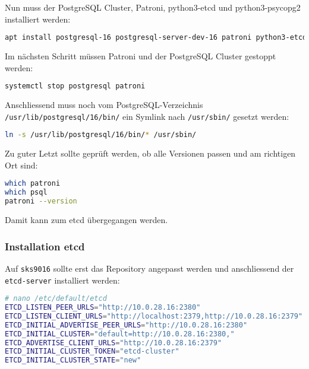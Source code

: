 Nun muss der \Gls{PostgreSQL Cluster}, Patroni, python3-etcd und python3-psycopg2 installiert werden:
\lstset{style=gra_codestyle}
\begin{lstlisting}[language=bash, caption=Patroni - Prerequisites installieren,captionpos=b,label={lst:patroni-prerequisites-install},breaklines=true]
apt install postgresql-16 postgresql-server-dev-16 patroni python3-etcd python3-psycopg2
\end{lstlisting}

Im nächsten Schritt müssen Patroni und der \Gls{PostgreSQL Cluster} gestoppt werden:
\lstset{style=gra_codestyle}
\begin{lstlisting}[language=bash, caption=Patroni - Stop Patroni und PostgreSQL,captionpos=b,label={lst:patroni-stop-postgresql-patroni},breaklines=true]
systemctl stop postgresql patroni
\end{lstlisting}

Anschliessend muss noch vom PostgreSQL-Verzeichnis \texttt{/usr/lib/postgresql/16/bin/} ein Symlink nach \texttt{/usr/sbin/} gesetzt werden:
\lstset{style=gra_codestyle}
\begin{lstlisting}[language=bash, caption=Patroni - Symlink binaries,captionpos=b,label={lst:patroni_symlink_bins},breaklines=true]
ln -s /usr/lib/postgresql/16/bin/* /usr/sbin/
\end{lstlisting}

Zu guter Letzt sollte geprüft werden, ob alle Versionen passen und am richtigen Ort sind:
\lstset{style=gra_codestyle}
\begin{lstlisting}[language=bash, caption=Patroni - Checks,captionpos=b,label={lst:patroni-checks},breaklines=true]
which patroni
which psql
patroni --version
\end{lstlisting}
Damit kann zum \gls{etcd} übergegangen werden.

\subsubsection{Installation \gls{etcd}}
Auf \texttt{sks9016} sollte erst das Repository angepasst werden und anschliessend der \texttt{etcd-server} installiert werden:
\lstset{style=gra_codestyle}
\begin{lstlisting}[language=bash, caption=Patroni - etcd-server konfigurieren=b,label={lst:patroni-etcd-server-config},breaklines=true]
# nano /etc/default/etcd
ETCD_LISTEN_PEER_URLS="http://10.0.28.16:2380"
ETCD_LISTEN_CLIENT_URLS="http://localhost:2379,http://10.0.28.16:2379"
ETCD_INITIAL_ADVERTISE_PEER_URLS="http://10.0.28.16:2380"
ETCD_INITIAL_CLUSTER="default=http://10.0.28.16:2380,"
ETCD_ADVERTISE_CLIENT_URLS="http://10.0.28.16:2379"
ETCD_INITIAL_CLUSTER_TOKEN="etcd-cluster"
ETCD_INITIAL_CLUSTER_STATE="new"
\end{lstlisting}

